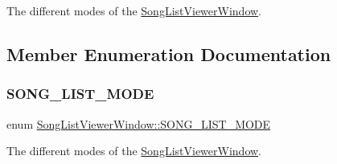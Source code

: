 The different modes of the \mbox{\hyperlink{class_song_list_viewer_window}{Song\+List\+Viewer\+Window}}. 



\subsection{Member Enumeration Documentation}
\mbox{\label{class_song_list_viewer_window_a6f23a68c416173f6b571a2cc4990a927}} 
\subsubsection{\texorpdfstring{S\+O\+N\+G\+\_\+\+L\+I\+S\+T\+\_\+\+M\+O\+DE}{SONG\_LIST\_MODE}}
{\footnotesize\ttfamily enum \mbox{\hyperlink{class_song_list_viewer_window_a6f23a68c416173f6b571a2cc4990a927}{Song\+List\+Viewer\+Window\+::\+S\+O\+N\+G\+\_\+\+L\+I\+S\+T\+\_\+\+M\+O\+DE}}}



The different modes of the \mbox{\hyperlink{class_song_list_viewer_window}{Song\+List\+Viewer\+Window}}. 

